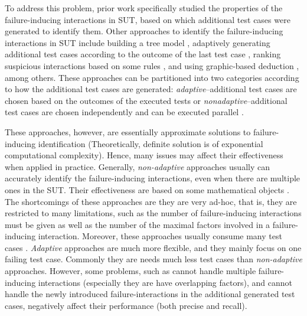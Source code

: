 \documentclass[10pt,journal,cspaper,compsoc]{IEEEtran}
\begin{document}
To address this problem, prior work \cite{nie2011minimal} specifically studied the properties of the failure-inducing interactions in SUT, based on which additional test cases were generated to identify them. Other approaches to identify the failure-inducing interactions in SUT include building a tree model \cite{yilmaz2006covering}, adaptively generating additional test cases according to the outcome of the last test case \cite{zhang2011characterizing}, ranking suspicious interactions based on some rules \cite{ghandehari2012identifying}, and using graphic-based deduction \cite{martinez2008algorithms}, among others. These approaches can be partitioned into two categories \cite{colbourn2008locating} according to how the additional test cases are generated: \emph{adaptive}--additional test cases are chosen based on the outcomes of the executed tests \cite{shi2005software,nie2011minimal,ghandehari2012identifying,niu2013identifying,zhang2011characterizing,shakya2012isolating,wang2010adaptive,li2012improved}or \emph{nonadaptive}--additional test cases are chosen independently and can be executed parallel \cite{yilmaz2006covering,colbourn2008locating,martinez2008algorithms,martinez2009locating,zhang2012faulty}.

These approaches, however, are essentially approximate solutions to failure-inducing identification (Theoretically, definite solution is of exponential computational complexity). Hence, many issues may affect their effectiveness when applied in practice.  Generally, \emph{non-adaptive} approaches usually can accurately identify the failure-inducing interactions, even when there are multiple ones in the SUT. Their effectiveness are based on some mathematical objects \cite{colbourn2008locating,martinez2008algorithms,martinez2009locating}. The shortcomings of these approaches are they are very ad-hoc, that is, they are restricted to many limitations, such as the number of failure-inducing interactions must be given as well as the number of the maximal factors involved in a failure-inducing interaction. Moreover, these approaches usually consume many test cases \cite{zhang2011characterizing}. \emph{Adaptive} approaches are much more flexible, and they mainly focus on one failing test case. Commonly they are needs much less test cases than \emph{non-adaptive} approaches. However, some problems, such as cannot handle multiple failure-inducing interactions (especially they are have overlapping factors), and cannot handle the newly introduced failure-interactions in the additional generated test cases, negatively affect their performance (both precise and recall).
\end{document}
